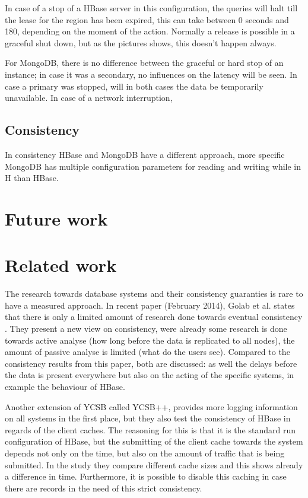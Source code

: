 \documentclass[final,5p,times]{elsarticle}
\begin{document}
In case of a stop of a HBase server in this configuration, the queries will halt till the lease for the region has been expired, this can take between 0 seconds and 180, depending on the moment of the action. Normally a release is possible in a graceful shut down, but as the pictures shows, this doesn't happen always. 

For MongoDB, there is no difference between the graceful or hard stop of an instance; in case it was a secondary, no influences on the latency will be seen. In case a primary was stopped, will in both cases the data be temporarily unavailable.  In case of a network interruption, 


\subsection{Consistency}
In consistency HBase and MongoDB have a different approach, more specific MongoDB has multiple configuration parameters for reading and writing while in H than HBase. 

\section{Future work}\label{sec:futurework}

\section{Related work}\label{sec:related work}
The research towards database systems and their consistency guaranties is rare to have a measured approach. In recent paper (February 2014), Golab et al. states that there is only a limited amount of research done towards eventual consistency \cite{golab2014eventually}. They present a new view on consistency, were already some research is done towards active analyse (how long before the data is replicated to all nodes), the amount of passive analyse is limited (what do the users see). Compared to the consistency results from this paper, both are discussed: as well the delays before the data is present everywhere but also on the acting of the specific systems, in example the behaviour of HBase. 

Another extension of YCSB called YCSB++\cite{patil2011ycsb++}, provides more logging information on all systems in the first place, but they also test the consistency of HBase in regards of the client caches. The reasoning for this is that it is the standard run configuration of HBase, but the submitting of the client cache towards the system depends not only on the time, but also on the amount of traffic that is being submitted. In the study they compare different cache sizes and this shows already a difference in time. Furthermore, it is possible to disable this caching in case there are records in the need of this strict consistency. 
\end{document}
